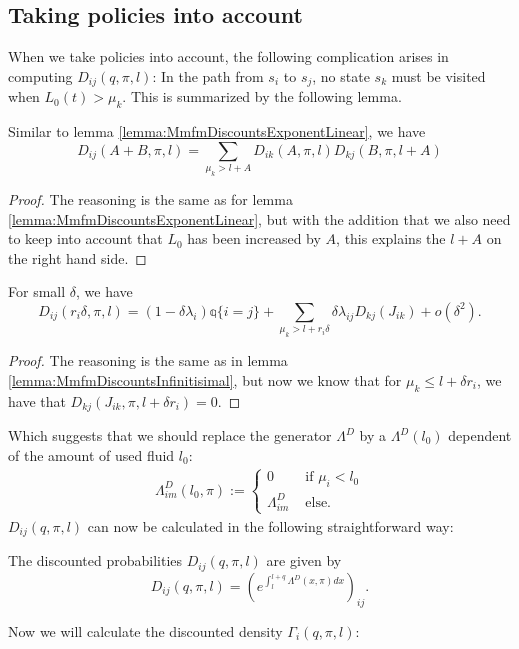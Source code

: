 \subsection{Taking policies into account}
When we take policies into account, the following complication arises in computing $D_{ij}(q, \pi,l)$:
In the path from $s_i$ to $s_j$, no state $s_k$ must be visited when $L_0(t)>\mu_k$.
This is summarized by the following lemma.
\begin{lemma}
	Similar to lemma \ref{lemma:MmfmDiscountsExponentLinear}, we have
	\[
	D_{ij}(A+B,\pi,l)=\sum\limits_{\mu_k>l+A} D_{ik}(A,\pi,l)D_{kj}(B,\pi,l+A)
	\]
	\begin{proof}
		The reasoning is the same as for lemma \ref{lemma:MmfmDiscountsExponentLinear}, but with the addition that we also need to keep into account that $L_0$ has been increased by $A$, this explains the $l+A$ on the right hand side.
	\end{proof}
\end{lemma}

\begin{lemma}
	For small $\delta$, we have
	\[
	D_{ij}(r_i\delta,\pi,l)=(1-\delta\lambda_i)\mathds{q}\{i=j\}+\sum\limits_{\mu_k>l+r_i\delta}\delta\lambda_{ij}D_{kj}(J_{ik})+o(\delta^2).
	\]
	\begin{proof}
		The reasoning is the same as in lemma \ref{lemma:MmfmDiscountsInfinitisimal}, but now we know that for $\mu_k\leq l+\delta r_i$, we have that $D_{kj}(J_{ik},\pi,l+\delta r_i)=0$.
	\end{proof}
\end{lemma}
Which suggests that we should replace the generator $\Lambda^D$ by a $\Lambda^D(l_0)$ dependent of the amount of used fluid $l_0$:
\begin{equation}
\begin{split}
\Lambda^D_{im}(l_0,\pi):=\begin{cases}
0&\text{ if }\mu_i<l_0\\
\Lambda^D_{im}&\text{ else.}
\end{cases}
\end{split}
\end{equation}
$D_{ij}(q, \pi,l)$ can now be calculated in the following straightforward way:
\begin{theorem}
	The discounted probabilities $D_{ij}(q, \pi,l)$ are given by
	\[
	D_{ij}(q, \pi,l)=\left(e^{\int_l^{l+q}\Lambda^D(x,\pi)dx}\right)_{ij}.
	\]
\end{theorem}
Now we will calculate the discounted density $\Gamma_i(q,\pi,l)$:

